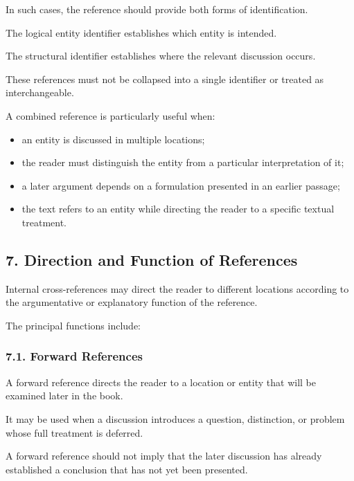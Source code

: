 In such cases, the reference should
provide both forms of identification.

The logical entity identifier establishes
which entity is intended.

The structural identifier establishes
where the relevant discussion occurs.

These references must not be collapsed
into a single identifier or treated
as interchangeable.

A combined reference is particularly
useful when:

\begin{itemize}
    \item an entity is discussed in
    multiple locations;
    \item the reader must distinguish
    the entity from a particular
    interpretation of it;
    \item a later argument depends
    on a formulation presented
    in an earlier passage;
    \item the text refers to an entity
    while directing the reader
    to a specific textual treatment.
\end{itemize}


\subsection*{7. Direction and Function of References}

Internal cross-references may direct
the reader to different locations
according to the argumentative
or explanatory function of the reference.

The principal functions include:

\subsubsection*{7.1. Forward References}

A forward reference directs the reader
to a location or entity that will be
examined later in the book.

It may be used when a discussion
introduces a question, distinction,
or problem whose full treatment
is deferred.

A forward reference should not imply
that the later discussion has already
established a conclusion that has
not yet been presented.

